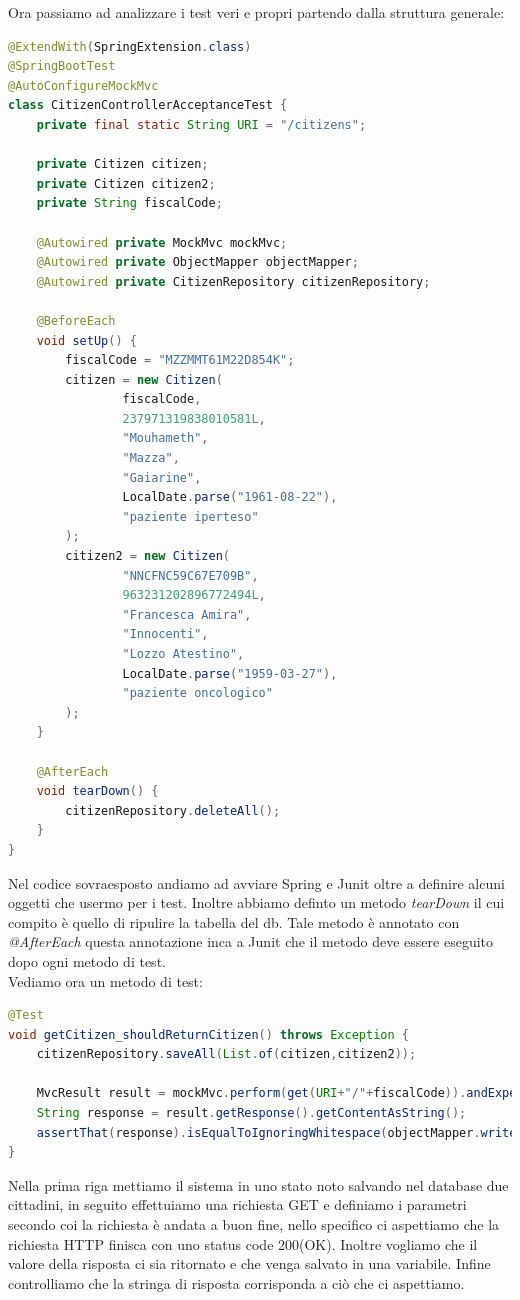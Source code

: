 \documentclass[a4paper,12pt,openany,oneside]{book}
\begin{document}
\newpage
\noindent Ora passiamo ad analizzare i test veri e propri partendo dalla struttura generale:
\begin{lstlisting}[language=Java]
@ExtendWith(SpringExtension.class)
@SpringBootTest
@AutoConfigureMockMvc
class CitizenControllerAcceptanceTest {
    private final static String URI = "/citizens";

    private Citizen citizen;
    private Citizen citizen2;
    private String fiscalCode;

    @Autowired private MockMvc mockMvc;
    @Autowired private ObjectMapper objectMapper;
    @Autowired private CitizenRepository citizenRepository;

    @BeforeEach
    void setUp() {
        fiscalCode = "MZZMMT61M22D854K";
        citizen = new Citizen(
                fiscalCode,
                237971319838010581L,
                "Mouhameth",
                "Mazza",
                "Gaiarine",
                LocalDate.parse("1961-08-22"),
                "paziente iperteso"
        );
        citizen2 = new Citizen(
                "NNCFNC59C67E709B",
                963231202896772494L,
                "Francesca Amira",
                "Innocenti",
                "Lozzo Atestino",
                LocalDate.parse("1959-03-27"),
                "paziente oncologico"
        );
    }

    @AfterEach
    void tearDown() {
        citizenRepository.deleteAll();
    }
}
\end{lstlisting}
Nel codice sovraesposto andiamo ad avviare Spring e Junit oltre a definire alcuni oggetti che usermo per i test.
Inoltre abbiamo definto un metodo \textit{tearDown} il cui compito è quello di ripulire la tabella del db.
Tale metodo è annotato con \textit{@AfterEach} questa annotazione inca a Junit che il metodo deve essere eseguito dopo ogni metodo di test.\\
\newpage \noindent Vediamo ora un metodo di test:
\begin{lstlisting}[language=Java]
@Test
void getCitizen_shouldReturnCitizen() throws Exception {
    citizenRepository.saveAll(List.of(citizen,citizen2));

    MvcResult result = mockMvc.perform(get(URI+"/"+fiscalCode)).andExpect(status().isOk()).andReturn();
    String response = result.getResponse().getContentAsString();
    assertThat(response).isEqualToIgnoringWhitespace(objectMapper.writeValueAsString(citizen));
}
\end{lstlisting}
Nella prima riga mettiamo il sistema in uno stato noto salvando nel database due cittadini, in seguito effettuiamo una richiesta GET e definiamo i parametri secondo coi la richiesta è andata a buon fine, nello specifico ci aspettiamo che la richiesta HTTP finisca con uno status code 200(OK). 
Inoltre vogliamo che il valore della risposta ci sia ritornato e che venga salvato in una variabile.
Infine controlliamo che la stringa di risposta corrisponda a ciò che ci aspettiamo.
\end{document}
